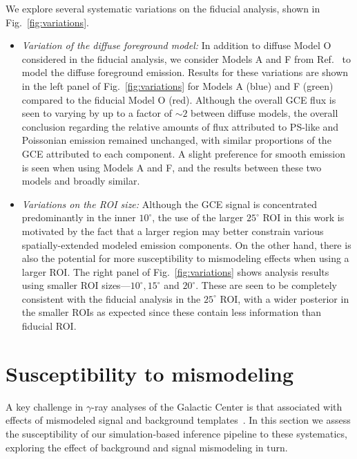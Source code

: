 \documentclass[prd,aps,10pt,nofootinbib,twocolumn,superscriptaddress,preprintnumbers,balancelastpage,longbibliography]{revtex4-1}
\begin{document}
We explore several systematic variations on the fiducial analysis, shown in Fig.~\ref{fig:variations}.

\begin{itemize}
    \item \emph{Variation of the diffuse foreground model:} In addition to diffuse Model O considered in the fiducial analysis, we consider Models A and F from Ref.~\cite{Calore:2014xka} to model the diffuse foreground emission. Results for these variations are shown in the left panel of Fig.~\ref{fig:variations} for Models A (blue) and F (green) compared to the fiducial Model O (red). Although the overall GCE flux is seen to varying by up to a factor of $\sim2$ between diffuse models, the overall conclusion regarding the relative amounts of flux attributed to PS-like and Poissonian emission remained unchanged, with similar proportions of the GCE attributed to each component. A slight preference for smooth emission is seen when using Models A and F, and the results between these two models and broadly similar. 
    \item \emph{Variations on the ROI size:} Although the GCE signal is concentrated predominantly in the inner $10^\circ$, the use of the larger $25^\circ$ ROI in this work is motivated by the fact that a larger region may better constrain various spatially-extended modeled emission components. On the other hand, there is also the potential for more susceptibility to mismodeling effects when using a larger ROI. The right panel of Fig.~\ref{fig:variations} shows analysis results using smaller ROI sizes---$10^\circ, 15^\circ$ and $20^\circ$. These are seen to be completely consistent with the fiducial analysis in the $25^\circ$ ROI, with a wider posterior in the smaller ROIs as expected since these contain less information than fiducial ROI.
\end{itemize}

\section{Susceptibility to mismodeling}
\label{sec:mismodeling}

A key challenge in $\gamma$-ray analyses of the Galactic Center is that associated with effects of mismodeled signal and background templates~\cite{Lee:2015fea,Leane:2020pfc,Leane:2020nmi,Buschmann:2020adf,Chang:2019ars}. In this section we assess the susceptibility of our simulation-based inference pipeline to these systematics, exploring the effect of background and signal mismodeling in turn. 
\end{document}
